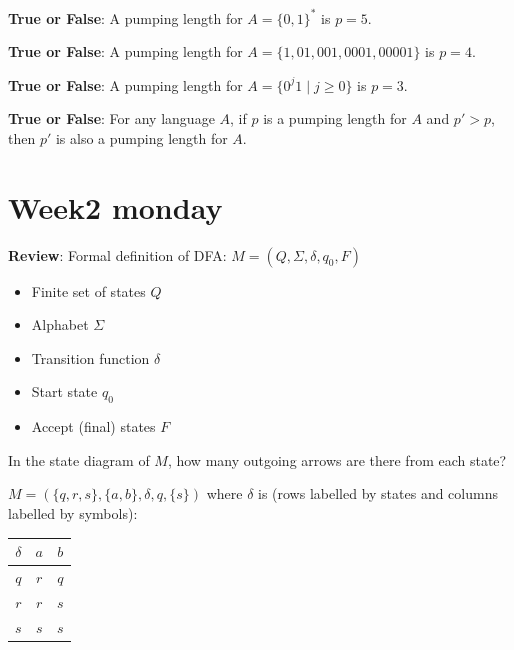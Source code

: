 \documentclass[12pt, oneside]{article}
\begin{document}
{\bf True or False}: A pumping length for $A = \{ 0,1 \}^*$ is $p = 5$.

\vspace{100pt}

{\bf True or False}: A pumping length for $A = \{1, 01, 001, 0001, 00001 \}$ is $p = 4$.

\vspace{100pt}

{\bf True or False}: A pumping length for $A = \{0^j 1 \mid  j \geq 0 \}$ is $p = 3$.


\vspace{100pt}

{\bf True or False}: For any language $A$, if $p$  is a  pumping length for $A$ and $p' > p$,  then 
$p'$ is also a pumping length for $A$.
 \vfill
\section*{Week2 monday}



{\bf Review}: Formal definition of DFA: $M = (Q, \Sigma, \delta, q_0, F)$ 

\begin{center}
\begin{multicols}{2}
\begin{itemize}
\setlength{\itemsep}{2pt}
\item Finite set of states $Q$
\item Alphabet $\Sigma$
\item Transition function $\delta$
\item Start state $q_0$
\item Accept (final) states $F$
\end{itemize}
\end{multicols}
\end{center}
In the state diagram of $M$, how many outgoing arrows are there from each state?

$M = ( \{ q, r, s\}, \{a,b\}, \delta, q, \{s\} )$ 
where $\delta$ is  (rows labelled by states
and columns labelled by symbols):
\begin{center}
\begin{tabular}{c|cc}
$\delta$ & $a$ & $b$ \\
\hline
$q$ & $r$ & $q$ \\
$r$ & $r$ & $s$ \\
$s$ & $s$ & $s$ \\
\end{tabular}
\end{center}
\end{document}
